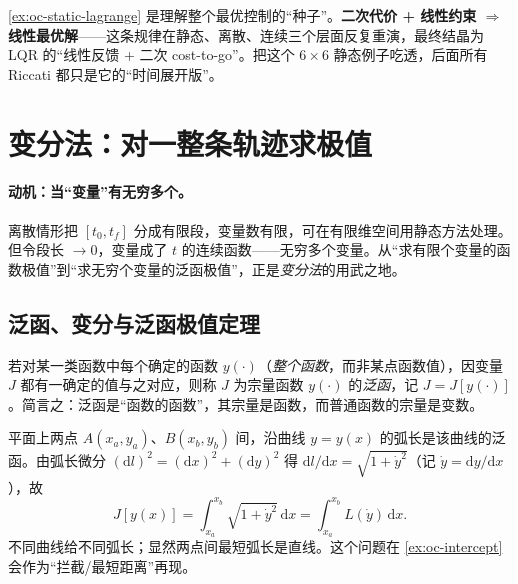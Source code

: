 \begin{insight}
\cref{ex:oc-static-lagrange} 是理解整个最优控制的“种子”。\textbf{二次代价 + 线性约束 $\Rightarrow$ 线性最优解}——这条规律在静态、离散、连续三个层面反复重演，最终结晶为 LQR 的“线性反馈 + 二次 cost-to-go”。把这个 $6\times6$ 静态例子吃透，后面所有 Riccati 都只是它的“时间展开版”。
\end{insight}

\section{变分法：对一整条轨迹求极值}
\label{sec:oc-variation}

\paragraph{动机：当“变量”有无穷多个。}
离散情形把 $[t_0,t_f]$ 分成有限段，变量数有限，可在有限维空间用静态方法处理。但令段长 $\to0$，变量成了 $t$ 的连续函数——无穷多个变量。从“求有限个变量的函数极值”到“求无穷个变量的泛函极值”，正是\emph{变分法}的用武之地\cite{liubao2006modern,zhang2017modern}。

\subsection{泛函、变分与泛函极值定理}
\label{sec:oc-functional}

\begin{definition}[泛函]\label{def:oc-functional}
若对某一类函数中每个确定的函数 $y(\cdot)$（\emph{整个函数}，而非某点函数值），因变量 $J$ 都有一确定的值与之对应，则称 $J$ 为宗量函数 $y(\cdot)$ 的\emph{泛函}，记 $J=J[y(\cdot)]$。简言之：泛函是“函数的函数”，其宗量是函数，而普通函数的宗量是变数。
\end{definition}

\begin{example}\label{ex:oc-arclength}
平面上两点 $A(x_a,y_a)$、$B(x_b,y_b)$ 间，沿曲线 $y=y(x)$ 的弧长是该曲线的泛函。由弧长微分 $(\mathrm dl)^2=(\mathrm dx)^2+(\mathrm dy)^2$ 得 $\mathrm dl/\mathrm dx=\sqrt{1+\dot y^2}$（记 $\dot y=\mathrm dy/\mathrm dx$），故
\begin{equation}
  J[y(x)]=\int_{x_a}^{x_b}\sqrt{1+\dot y^2}\,\mathrm dx=\int_{x_a}^{x_b}L(\dot y)\,\mathrm dx.
  \label{eq:oc-arclength}
\end{equation}
不同曲线给不同弧长；显然两点间最短弧长是直线。这个问题在 \cref{ex:oc-intercept} 会作为“拦截/最短距离”再现。
\end{example}

